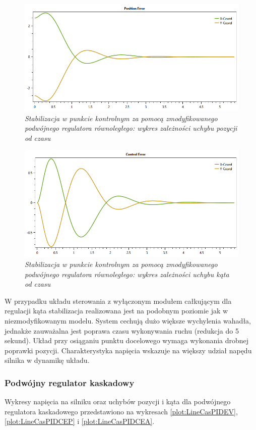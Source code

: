 \documentclass[12pt, oneside]{report}
\theoremstyle{definition}
\begin{document}
\begin{figure}[H]
	\centering
		\includegraphics[width = 350pt]{LinePDCEP} 
		\caption{\textit{Stabilizacja w punkcie kontrolnym za pomocą zmodyfikowanego podwójnego regulatora równoległego: wykres zależności uchybu pozycji od czasu}}
		\label{plot:LinePDCEP}
\end{figure}

\begin{figure}[H]
	\centering
		\includegraphics[width = 350pt]{LinePDCEA} 
		\caption{\textit{Stabilizacja w punkcie kontrolnym za pomocą zmodyfikowanego podwójnego regulatora równoległego: wykres zależności uchybu kąta od czasu}}
		\label{plot:LinePDCEA}
\end{figure}

W przypadku układu sterowania z wyłączonym modułem całkującym dla regulacji kąta stabilizacja realizowana jest na podobnym poziomie jak w niezmodyfikowanym modelu. System cechują dużo większe wychylenia wahadła, jednakże zauważalna jest poprawa czasu wykonywania ruchu (redukcja do 5 sekund). Układ przy osiąganiu punktu docelowego wymaga wykonania drobnej poprawki pozycji. Charakterystyka napięcia wskazuje na większy udział napędu silnika w dynamikę układu. 

\subsubsection{Podwójny regulator kaskadowy}
Wykresy napięcia na silniku oraz uchybów pozycji i kąta dla podwójnego regulatora kaskadowego przedstawiono na wykresach \ref{plot:LineCasPIDEV}, \ref{plot:LineCasPIDCEP} i \ref{plot:LineCasPIDCEA}.
\end{document}

